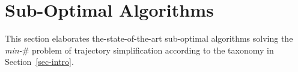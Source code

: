 
\section{Sub-Optimal Algorithms}
\label{sec-subopt}



This section elaborates the-state-of-the-art sub-optimal algorithms solving the \emph{min-$\#$} problem of trajectory simplification according to the taxonomy in Section~\ref{sec-intro}.









